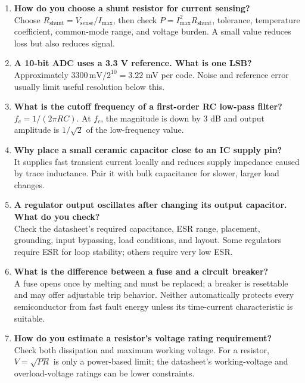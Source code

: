 \documentclass[11pt]{article}
\begin{document}
\begin{enumerate}
\item \textbf{How do you choose a shunt resistor for current sensing?}\\
Choose $R_\mathrm{shunt}=V_\mathrm{sense}/I_\mathrm{max}$, then check $P=I_\mathrm{max}^2R_\mathrm{shunt}$, tolerance, temperature coefficient, common-mode range, and voltage burden. A small value reduces loss but also reduces signal.

\item \textbf{A 10-bit ADC uses a 3.3 V reference. What is one LSB?}\\
Approximately $3300\,\mathrm{mV}/2^{10}=3.22$ mV per code. Noise and reference error usually limit useful resolution below this.

\item \textbf{What is the cutoff frequency of a first-order RC low-pass filter?}\\
$f_c=1/(2\pi RC)$. At $f_c$, the magnitude is down by 3 dB and output amplitude is $1/\sqrt{2}$ of the low-frequency value.

\item \textbf{Why place a small ceramic capacitor close to an IC supply pin?}\\
It supplies fast transient current locally and reduces supply impedance caused by trace inductance. Pair it with bulk capacitance for slower, larger load changes.

\item \textbf{A regulator output oscillates after changing its output capacitor. What do you check?}\\
Check the datasheet's required capacitance, ESR range, placement, grounding, input bypassing, load conditions, and layout. Some regulators require ESR for loop stability; others require very low ESR.

\item \textbf{What is the difference between a fuse and a circuit breaker?}\\
A fuse opens once by melting and must be replaced; a breaker is resettable and may offer adjustable trip behavior. Neither automatically protects every semiconductor from fast fault energy unless its time-current characteristic is suitable.

\item \textbf{How do you estimate a resistor's voltage rating requirement?}\\
Check both dissipation and maximum working voltage. For a resistor, $V=\sqrt{PR}$ is only a power-based limit; the datasheet's working-voltage and overload-voltage ratings can be lower constraints.


\end{enumerate}
\end{document}
